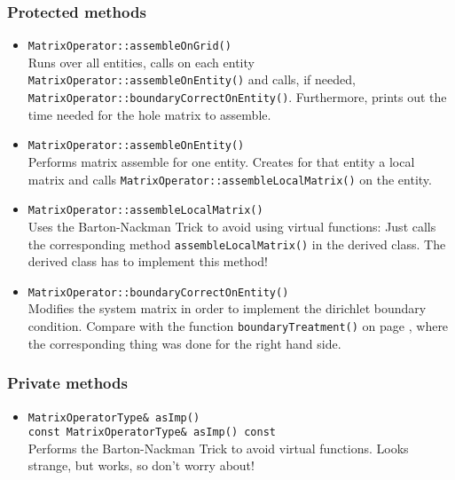 \subsubsection{Protected methods}
\begin{itemize}
 \item \texttt{MatrixOperator::assembleOnGrid()}\\
    Runs over all entities, calls on each entity \texttt{MatrixOperator::assembleOnEntity()} and calls,
    if needed, \texttt{MatrixOperator::boundaryCorrectOnEntity()}.
    Furthermore, prints out the time needed for the hole matrix to assemble.

 \item \texttt{MatrixOperator::assembleOnEntity()}\\
    Performs matrix assemble for one entity. Creates for that entity a local matrix and calls
    \texttt{MatrixOperator::assembleLocalMatrix()} on the entity.

 \item \texttt{MatrixOperator::assembleLocalMatrix()}\\
    Uses the Barton-Nackman Trick to avoid using virtual functions: Just calls the corresponding method
    \texttt{assembleLocalMatrix()} in the derived class. The derived class has to implement this method!

 \item \texttt{MatrixOperator::boundaryCorrectOnEntity()}\\
    Modifies the system matrix in order to implement the dirichlet boundary condition. Compare with the function
    \texttt{boundaryTreatment()} on page \pageref{boundaryTreatment}, where the corresponding thing was done
    for the right hand side.
\end{itemize}


\subsubsection{Private methods}
\begin{itemize}
 \item \texttt{MatrixOperatorType\& asImp()}\\
       \texttt{const MatrixOperatorType\& asImp() const}\\
    Performs the Barton-Nackman Trick to avoid virtual functions. Looks strange, but works, so don't worry about!
\end{itemize}




